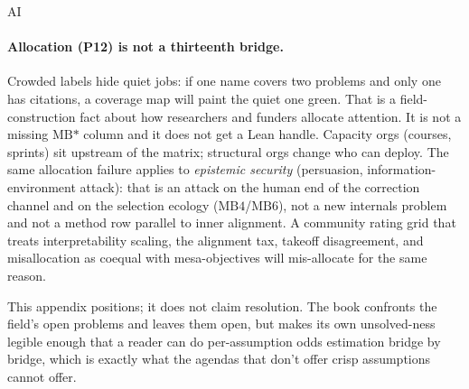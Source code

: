 \begin{authbar}{AI}
\paragraph{Allocation (P12) is not a thirteenth bridge.}
Crowded labels hide quiet jobs: if one name covers two problems and only one has citations, a coverage map will paint the quiet one green.
That is a field-construction fact about how researchers and funders allocate attention.
It is not a missing \(\text{MB*}\) column and it does not get a Lean handle.
Capacity orgs (courses, sprints) sit upstream of the matrix; structural orgs change who can deploy.
The same allocation failure applies to \emph{epistemic security} (persuasion, information-environment attack): that is an attack on the human end of the correction channel and on the selection ecology (\(\text{MB4}\)/\(\text{MB6}\)), not a new internals problem and not a method row parallel to inner alignment.
A community rating grid that treats interpretability scaling, the alignment tax, takeoff disagreement, and misallocation as coequal with mesa-objectives will mis-allocate for the same reason.

This appendix positions; it does not claim resolution.
The book confronts the field's open problems and leaves them open, but makes its own unsolved-ness legible enough that a reader can do per-assumption odds estimation bridge by bridge, which is exactly what the agendas that don't offer crisp assumptions cannot offer.
\end{authbar}
